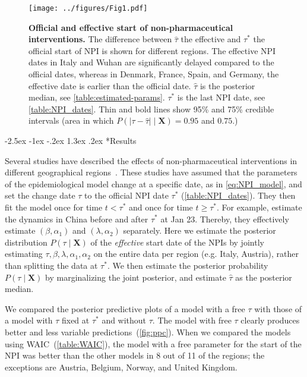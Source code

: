 \documentclass[12pt]{extarticle}
\makeatletter
\renewcommand\section{\@startsection {section}{1}{\z@}%
     {-2.5ex \@plus -1ex \@minus -.2ex}%
     {1.3ex \@plus.2ex}%
    {\Large\bfseries}}
\let\vec\mathbf
\makeatother
\begin{document}
\begin{figure}[h]
    \centering
	\texttt{[image: ../figures/Fig1.pdf]}
    \caption{
    \textbf{Official and effective start of non-pharmaceutical interventions.}
    	The difference between $\hat{\tau}$ the effective and $\tau^*$ the official start of NPI is shown for different regions. The effective NPI dates in Italy and Wuhan are significantly delayed compared to the official dates, whereas in Denmark, France, Spain, and Germany, the effective date is earlier than the official date.
	$\hat{\tau}$ is the posterior median, see \autoref{table:estimated-params}. $\tau^*$ is the last NPI date, see \autoref{table:NPI_dates}. Thin and bold lines show 95\% and 75\% credible intervals (area in which $P(|\tau - \hat{\tau}| \mid \vec{X}) = 0.95$ and $0.75$.)
    }
    \label{fig:fig1}
\end{figure}



\section*{Results}

Several studies have described the effects of non-pharmaceutical interventions in different geographical regions~\citep{Flaxman2020,Gatto2020,Li2020}. 
These studies have assumed that the parameters of the epidemiological model change at a specific date, as in \autoref{eq:NPI_model}, and set the change date $\tau$ to the official NPI date $\tau^*$ (\autoref{table:NPI_dates}).
They then fit the model once for time $t<\tau^*$ and once for time $t \ge \tau^*$.
For example, \citet{Li2020} estimate the dynamics in China before and after $\tau^*$ at Jan 23. Thereby, they effectively estimate $(\beta, \alpha_1)$ and $(\lambda, \alpha_2)$ separately.
Here we estimate the posterior distribution $P(\tau \mid \vec{X})$ of the \emph{effective} start date of the NPIs by jointly estimating $\tau, \beta, \lambda, \alpha_1, \alpha_2$ on the entire data per region (e.g. Italy, Austria), rather than splitting the data at $\tau^*$.
We then estimate the posterior probability $P(\tau \mid \vec{X})$ by marginalizing the joint posterior, and estimate $\hat{\tau}$ as the posterior median.

We compared the posterior predictive plots of a model with a free $\tau$ with those of a model with $\tau$ fixed at $\tau^*$ and without $\tau$. The model with free $\tau$ clearly produces better and less variable predictions~(\autoref{fig:ppc}). 
When we compared the models using WAIC~(\autoref{table:WAIC}), the model with a free parameter for the start of the NPI was better than the other models in 8 out of 11 of the regions; the exceptions are Austria, Belgium, Norway, and United Kingdom.
\end{document}
